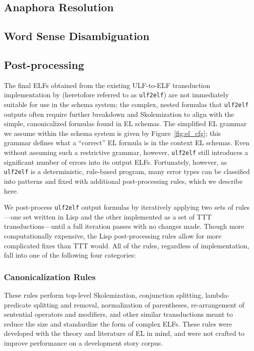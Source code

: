 \subsection{Anaphora Resolution}

\subsection{Word Sense Disambiguation}

\subsection{Post-processing}
\label{subsec:postproc}
The final ELFs obtained from the existing ULF-to-ELF transduction implementation by \citet{schubert-2014-treebank} (heretofore referred to as \texttt{ulf2elf}) are not immediately suitable for use in the schema system; the complex, nested formulas that \texttt{ulf2elf} outputs often require further breakdown and Skolemization to align with the simple, canonicalized formulas found in EL schemas. The simplified EL grammar we assume within the schema system is given by Figure~\ref{fig:el_cfg}; this grammar defines what a ``correct'' EL formula is in the context EL schemas. Even without assuming such a restrictive grammar, however, \texttt{ulf2elf} still introduces a significant number of errors into its output ELFs. Fortunately, however, as \texttt{ulf2elf} is a deterministic, rule-based program, many error types can be classified into patterns and fixed with additional post-processing rules, which we describe here.

We post-process \texttt{ulf2elf} output formulas by iteratively applying two sets of rules---one set written in Lisp and the other implemented as a set of TTT transductions---until a full iteration passes with no changes made. Though more computationally expensive, the Lisp post-processing rules allow for more complicated fixes than TTT would. All of the rules, regardless of implementation, fall into one of the following four categories:

\subsubsection{Canonicalization Rules}
These rules perform top-level Skolemization, conjunction splitting, lambda-predicate splitting and removal, normalization of parentheses, re-arrangement of sentential operators and modifiers, and other similar transductions meant to reduce the size and standardize the form of complex ELFs. These rules were developed with the theory and literature of EL in mind, and were not crafted to improve performance on a development story corpus.

